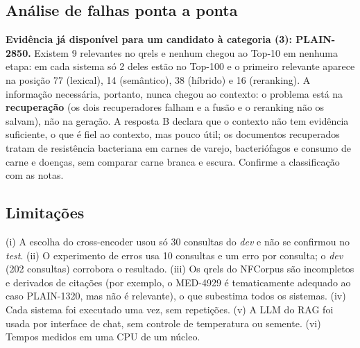 \subsection{Análise de falhas ponta a ponta}
\textbf{Evidência já disponível para um candidato à categoria (3): PLAIN-2850.} Existem 9 relevantes no qrels e nenhum chegou ao Top-10 em nenhuma etapa: em cada sistema só 2 deles estão no Top-100 e o primeiro relevante aparece na posição 77 (lexical), 14 (semântico), 38 (híbrido) e 16 (reranking). A informação necessária, portanto, nunca chegou ao contexto: o problema está na \textbf{recuperação} (os dois recuperadores falham e a fusão e o reranking não os salvam), não na geração. A resposta B declara que o contexto não tem evidência suficiente, o que é fiel ao contexto, mas pouco útil; os documentos recuperados tratam de resistência bacteriana em carnes de varejo, bacteriófagos e consumo de carne e doenças, sem comparar carne branca e escura. Confirme a classificação com as notas.

\subsection{Limitações}
(i) A escolha do cross-encoder usou só 30 consultas do \emph{dev} e não se confirmou no \emph{test}. (ii) O experimento de erros usa 10 consultas e um erro por consulta; o \emph{dev} (202 consultas) corrobora o resultado. (iii) Os qrels do NFCorpus são incompletos e derivados de citações (por exemplo, o MED-4929 é tematicamente adequado ao caso PLAIN-1320, mas não é relevante), o que subestima todos os sistemas. (iv) Cada sistema foi executado uma vez, sem repetições. (v) A LLM do RAG foi usada por interface de chat, sem controle de temperatura ou semente. (vi) Tempos medidos em uma CPU de um núcleo.
